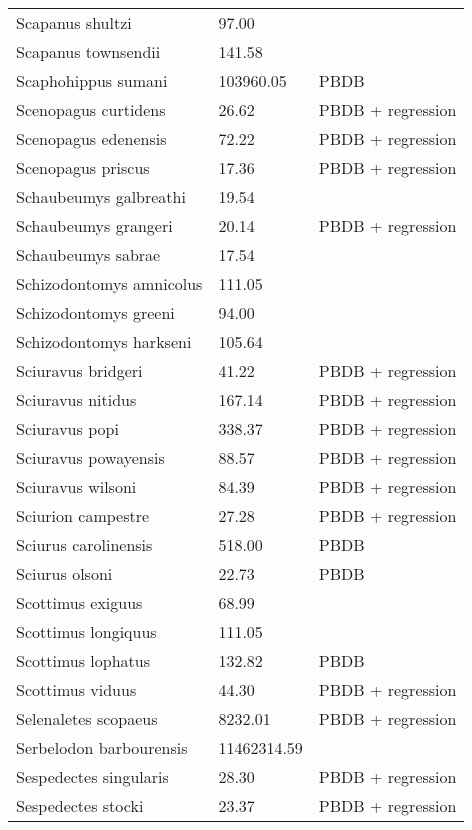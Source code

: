 \documentclass{article}
\begin{document}
\begin{center}
\begin{longtable}{p{} p{} p{} }
  Scapanus shultzi & 97.00 & \cite{McKenna2011} \\ 
  Scapanus townsendii & 141.58 & \cite{Smith2004} \\ 
  Scaphohippus sumani & 103960.05 & PBDB \\ 
  Scenopagus curtidens & 26.62 & PBDB + regression \\ 
  Scenopagus edenensis & 72.22 & PBDB + regression \\ 
  Scenopagus priscus & 17.36 & PBDB + regression \\ 
  Schaubeumys galbreathi & 19.54 & \cite{Loomis1911} \\ 
  Schaubeumys grangeri & 20.14 & PBDB + regression \\ 
  Schaubeumys sabrae & 17.54 & \cite{Matthew1901} \\ 
  Schizodontomys amnicolus & 111.05 & \cite{Tomiya2013} \\ 
  Schizodontomys greeni & 94.00 & \cite{McKenna2011} \\ 
  Schizodontomys harkseni & 105.64 & \cite{Tomiya2013} \\ 
  Sciuravus bridgeri & 41.22 & PBDB + regression \\ 
  Sciuravus nitidus & 167.14 & PBDB + regression \\ 
  Sciuravus popi & 338.37 & PBDB + regression \\ 
  Sciuravus powayensis & 88.57 & PBDB + regression \\ 
  Sciuravus wilsoni & 84.39 & PBDB + regression \\ 
  Sciurion campestre & 27.28 & PBDB + regression \\ 
  Sciurus carolinensis & 518.00 & PBDB \\ 
  Sciurus olsoni & 22.73 & PBDB \\ 
  Scottimus exiguus & 68.99 & \cite{Novacek1977} \\ 
  Scottimus longiquus & 111.05 & \cite{Tomiya2013} \\ 
  Scottimus lophatus & 132.82 & PBDB \\ 
  Scottimus viduus & 44.30 & PBDB + regression \\ 
  Selenaletes scopaeus & 8232.01 & PBDB + regression \\ 
  Serbelodon barbourensis & 11462314.59 & \cite{Secord2008a} \\ 
  Sespedectes singularis & 28.30 & PBDB + regression \\ 
  Sespedectes stocki & 23.37 & PBDB + regression \\ 

\end{longtable}
\end{center}
\end{document}
